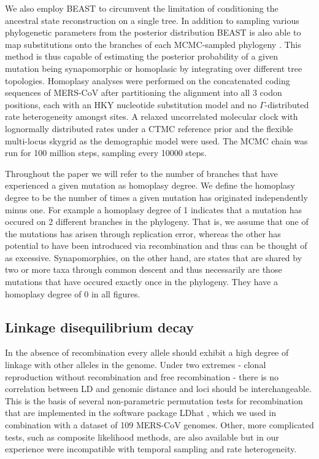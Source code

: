 \documentclass[11pt,oneside,letterpaper]{article}
\begin{document}
We also employ BEAST \citep{drummond_2012} to circumvent the limitation of conditioning the ancestral state reconstruction on a single tree.
In addition to sampling various phylogenetic parameters from the posterior distribution BEAST is also able to map substitutions onto the branches of each MCMC-sampled phylogeny \citep{obrien_2009}.
This method is thus capable of estimating the posterior probability of a given mutation being synapomorphic or homoplasic by integrating over different tree topologies.
Homoplasy analyses were performed on the concatenated coding sequences of MERS-CoV after partitioning the alignment into all 3 codon positions, each with an HKY nucleotide substitution model \citep{hky_1985} and no $\Gamma$-distributed rate heterogeneity amongst sites.
A relaxed uncorrelated molecular clock with lognormally distributed rates \citep{drummond_2006} under a CTMC reference prior \citep{ferreira_2008} and the flexible multi-locus skygrid as the demographic model \citep{gill_2013} were used.
The MCMC chain was run for 100 million steps, sampling every 10000 steps.

Throughout the paper we will refer to the number of branches that have experienced a given mutation as homoplasy degree.
We define the homoplasy degree to be the number of times a given mutation has originated independently minus one.
For example a homoplasy degree of 1 indicates that a mutation has occured on 2 different branches in the phylogeny.
That is, we assume that one of the mutations has arisen through replication error, whereas the other has potential to have been introduced via recombination and thus can be thought of as excessive.
Synapomorphies, on the other hand, are states that are shared by two or more taxa through common descent and thus necessarily are those mutations that have occured exactly once in the phylogeny.
They have a homoplasy degree of 0 in all figures.

\subsection*{Linkage disequilibrium decay}
In the absence of recombination every allele should exhibit a high degree of linkage with other alleles in the genome.
Under two extremes - clonal reproduction without recombination and free recombination - there is no correlation between LD and genomic distance and loci should be interchangeable.
This is the basis of several non-parametric permutation tests for recombination that are implemented in the software package LDhat \citep{mcvean_2002}, which we used in combination with a dataset of 109 MERS-CoV genomes.
Other, more complicated tests, such as composite likelihood methods, are also available but in our experience were incompatible with temporal sampling and rate heterogeneity.
\end{document}
